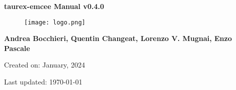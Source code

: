 

\begin{titlepage}

    \centering

    \vspace*{30mm} %
    \textbf{\Huge {taurex-emcee Manual v0.4.0}}

    \vspace{20mm}
    \begin{figure}[!h]
        \centering
        \texttt{[image: logo.png]}
        \label{fig:logo}
    \end{figure}

    \vspace{25mm}
    \Large \textbf{{Andrea Bocchieri, Quentin Changeat, Lorenzo V. Mugnai, Enzo Pascale}}

    \vspace*{8mm}
    \small Created on: January, 2024

    \vspace{2mm}
    \small Last updated: \MonthYearFormat\today


\end{titlepage}

\clearpage
{}
\tableofcontents
\listoffigures
\listoftables
\clearpage
{}